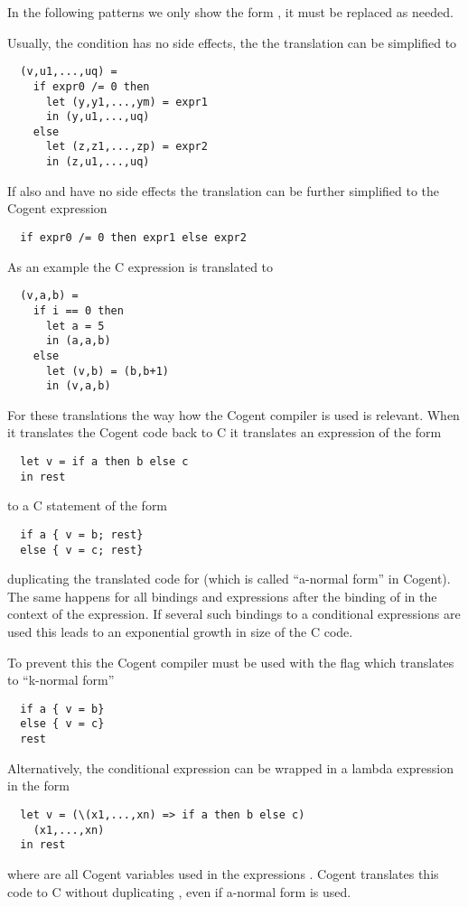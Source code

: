 In the following patterns we only show the form , it must be replaced as needed.

Usually, the condition  has no side effects, the the translation can be simplified to
\begin{verbatim}
  (v,u1,...,uq) = 
    if expr0 /= 0 then 
      let (y,y1,...,ym) = expr1 
      in (y,u1,...,uq)
    else
      let (z,z1,...,zp) = expr2
      in (z,u1,...,uq)
\end{verbatim}

If also  and  have no side effects the translation can be further simplified to
the Cogent expression
\begin{verbatim}
  if expr0 /= 0 then expr1 else expr2
\end{verbatim}

As an example the C expression  is translated to
\begin{verbatim}
  (v,a,b) = 
    if i == 0 then 
      let a = 5
      in (a,a,b)
    else
      let (v,b) = (b,b+1)
      in (v,a,b)
\end{verbatim}

For these translations the way how the Cogent compiler is used is relevant. When it translates the Cogent code back to 
C it translates an expression of the form
\begin{verbatim}
  let v = if a then b else c
  in rest
\end{verbatim}
to a C statement of the form
\begin{verbatim}
  if a { v = b; rest}
  else { v = c; rest}
\end{verbatim}
duplicating the translated code for  (which is called ``a-normal form'' in Cogent). 
The same happens for all bindings and expressions after
the binding of  in the context of the  expression. If several such bindings to a 
conditional expressions are used this leads to an exponential growth in size of the C code.

To prevent this the Cogent compiler must be used with the flag 
which translates to ``k-normal form''
\begin{verbatim}
  if a { v = b}
  else { v = c}
  rest
\end{verbatim}

Alternatively, the conditional expression can be wrapped in a lambda expression in the form
\begin{verbatim}
  let v = (\(x1,...,xn) => if a then b else c) 
    (x1,...,xn)
  in rest
\end{verbatim}
where  are all Cogent variables used in the expressions .
Cogent translates this code to C without duplicating , even if a-normal form is used.

